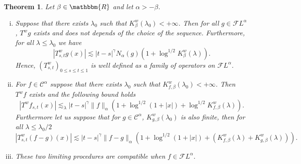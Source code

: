\documentclass[a4paper,11pt]{article}
\newcommand{\nocomma}{}
\newenvironment{enumerateroman}{\begin{enumerate}[i.] }{\end{enumerate}}
\newtheorem{theorem}{Theorem}[section]
\newcommand{\CC}{\mathscr C}
\newcommand{\CF}{\mathscr F}
\begin{document}
\begin{theorem}
  \label{theorem:definition_T}Let $\beta \in \mathbbm{R}$ and let $\alpha >-
  \beta$.
  \begin{enumerateroman}
    \item Suppose that there exists $\lambda_{0}$ such that $K^{w}_{\beta} (
    \lambda_{0} ) <+ \infty$. Then for all $g \in \CF L^{\alpha}$, $T^{w} g$
    exists and does not depends of the choice of the sequence. Furthermore,
    for all $\lambda \leqslant \lambda_{0}$ we have
    \[ | T^{w}_{s,t} g ( x ) | \lesssim | t-s |^{\gamma} N_{\alpha} ( g ) ( 1+
       \log^{1/2} K^{w}_{\beta} ( \lambda ) ) . \]
    Hence, $( T^{w}_{s,t} )_{0 \leqslant s \leqslant t \leqslant 1}$ is well
    defined as a family of operators on $\CF L^{\alpha}$.
    
    \item For $f \in \CC^{\alpha}$ suppose that there exists $\lambda_{0}$
    such that $K^{w}_{f, \beta} \nocomma ( \lambda_{0} ) <+ \infty$. Then
    $T^{w} f$ exists and the following bound holds
    \[ | T^{w} f_{s,t} ( x ) | \lesssim_{\lambda} | t-s |^{\gamma} \| f
       \|_{\alpha} ( 1+ \log^{1/2} ( 1+ | x | ) + \log^{1/2} K_{f, \beta}^{w}
       ( \lambda ) ) . \]
    Furthermore let us suppose that for $g \in \CC^{\alpha}$, $K^{w}_{g,
    \beta} ( \lambda_{0} )$ is also finite, then for all $\lambda \leqslant
    \lambda_{0} /2$
    \[ | T^{w}_{s,t} ( f-g ) ( x ) | \lesssim | t-s |^{\gamma} \| f-g
       \|_{\alpha} ( 1+ \log^{1/2} ( 1+ | x | ) + ( K^{w}_{f, \beta} ( \lambda
       ) +K^{w}_{g, \beta} ( \lambda ) ) ). \]
    \item These two limiting procedures are compatible when $f \in \CF
    L^{\alpha}$.
  \end{enumerateroman}
\end{theorem}
\end{document}
